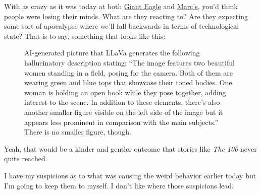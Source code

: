 With as crazy as it was today at both
\href{https://www.gianteagle.com}{Giant Eagle} and
\href{https://www.marcs.com}{Marc's}, you'd think people were losing
their minds. What are they reacting to? Are they expecting some sort of
apocalypse where we'll fall backwards in terms of technological state?
That is to say, something that looks like this:

\begin{figure}
\centering
{}
\caption{AI-generated picture that LLaVa generates the following
hallucinatory description stating: ``The image features two beautiful
women standing in a field, posing for the camera. Both of them are
wearing green and blue tops that showcase their toned bodies. One woman
is holding an open book while they pose together, adding interest to the
scene. In addition to these elements, there's also another smaller
figure visible on the left side of the image but it appears less
prominent in comparison with the main subjects.'' There is no smaller
figure, though.}
\end{figure}

Yeah, that would be a kinder and gentler outcome that stories like
\emph{The 100} never quite reached.

I have my suspicions as to what was causing the weird behavior earlier
today but I'm going to keep them to myself. I don't like where those
suspicions lead.
